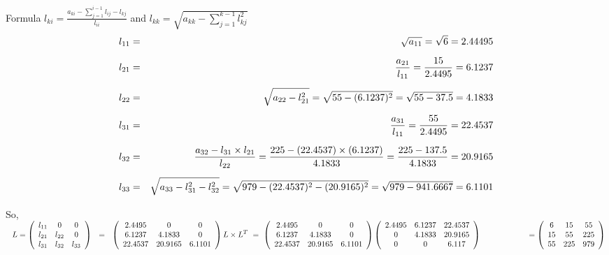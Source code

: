 \documentclass[a4paper, 12pt]{report}
\newcommand{\sps}{\\[0.2cm]}
\newcommand{\spn}[1]{\\[#1cm]}
\newcommand{\NI}{\noindent}
\newcommand{\dsp}{\displaystyle}
\begin{document}
{\NI Formula $\dsp l_{ki} = \frac{a_{ki} - \sum\limits_{j=1}^{i-1} l_{ij} - l_{kj}}{l_{ii}} $ and $\dsp l_{kk} = \sqrt{a_{kk} - \sum\limits_{j=1}^{k-1}l_{kj}^2}$
\begin{eqnarray}
l_{11} &=& \sqrt{a_{11}} = \sqrt{6} = 2.44495 \notag\sps
l_{21} &=& \frac{a_{21}}{l_{11}} = \frac{15}{2.4495} = 6.1237 \notag \sps
l_{22} &=& \sqrt{a_{22} - l_{21}^2} = \sqrt{55 - (6.1237)^2} = \sqrt{55-37.5} = 4.1833 \notag \sps
l_{31} &=& \frac{a_{31}}{l_{11}} = \frac{55}{2.4495} = 22.4537 \notag \sps
l_{32} &=& \frac{a_{32} - l_{31} \times l_{21}}{l_{22}} = \frac{225 - (22.4537) \times (6.1237)}{4.1833} = \frac{225-137.5}{4.1833} = 20.9165 \notag \sps
l_{33} &=& \sqrt{a_{33} - l_{31}^2 - l_{32}^2} = \sqrt{979 - (22.4537)^2 - (20.9165)^2} = \sqrt{979 - 941.6667} = 6.1101 \notag \sps
\end{eqnarray}
So, 
$\dsp
~~L = 
\left(
\begin{array}{ccc}
l_{11} & 0 & 0 \\
l_{21} & l_{22} & 0 \\
l_{31} & l_{32} & l_{33}\\
\end{array}
\right) ~~ = ~~
\left(
\begin{array}{ccc}
2.4495 & 0 & 0 \\
6.1237 & 4.1833 & 0\\
22.4537 & 20.9165 & 6.1101\\
\end{array}
\right)
\spn{0.9}
L\times L^T ~=~ 
\left( 
\begin{array}{ccc}
2.4495 & 0 & 0 \\
6.1237 & 4.1833 & 0\\
22.4537 & 20.9165 & 6.1101\\
\end{array}
\right)
\left(
\begin{array}{ccc}
2.4495 & 6.1237 & 22.4537\\
0 & 4.1833 & 20.9165 \\
0 & 0 & 6.117\\
\end{array}
\right)
\spn{0.9}
~~~~~~~~~~~~~~~~~~= 
\left(
\begin{array}{cccc}
6 & 15 & 55\\
15 & 55 & 225\\
55 & 225 & 979\\
\end{array}
\right)
$\sps

}
\end{document}
